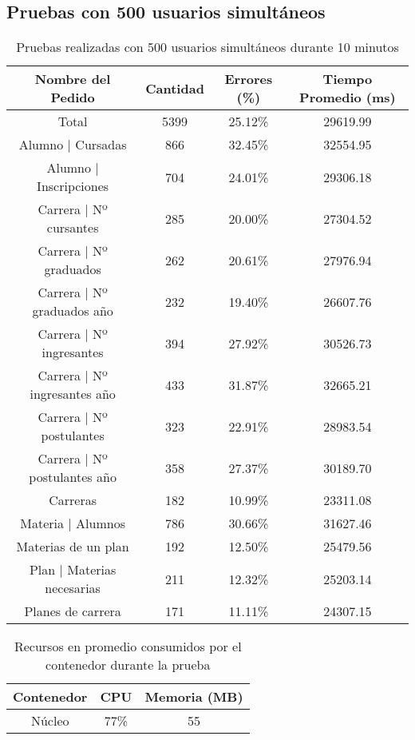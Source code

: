 \subsection{Pruebas con 500 usuarios simultáneos}
\begin{table}[]
    \centering
    \makegapedcells
    \begin{tabular}{|c|c|c|c|}
    \hline
    Nombre del Pedido & Cantidad & Errores (\%) & Tiempo Promedio (ms) \\ \hline
    Total & 5399 & 25.12\% & 29619.99 \\ \hline
    Alumno | Cursadas & 866 & 32.45\% & 32554.95 \\ \hline
    Alumno | Inscripciones & 704 & 24.01\% & 29306.18\\ \hline
    Carrera | Nº cursantes & 285 & 20.00\% & 27304.52\\ \hline
    Carrera | Nº graduados & 262 & 20.61\%	& 27976.94\\ \hline
    Carrera | Nº graduados año & 232 & 19.40\% & 26607.76\\ \hline
    Carrera | Nº ingresantes & 394 & 27.92\% & 30526.73\\ \hline
    Carrera | Nº ingresantes año & 433 & 31.87\% & 32665.21\\ \hline
    Carrera | Nº postulantes & 323 & 22.91\% & 28983.54\\ \hline
    Carrera | Nº postulantes año & 358 & 27.37\% & 30189.70\\ \hline
    Carreras & 182 & 10.99\% & 23311.08\\ \hline
    Materia | Alumnos & 786 & 30.66\% & 31627.46\\ \hline
    Materias de un plan & 192 & 12.50\%	& 25479.56\\ \hline
    Plan | Materias necesarias & 211 & 12.32\% & 25203.14\\ \hline
    Planes de carrera & 171 & 11.11\% & 24307.15\\ \hline

    \end{tabular}
    \caption{Pruebas realizadas con 500 usuarios simultáneos durante 10 minutos}
    \label{tab:tabla_planes}
\end{table}



\begin{table}[]
    \centering
    \makegapedcells
    \begin{tabular}{|c|c|c}
    \hline
    Contenedor & CPU & Memoria (MB)\\ \hline
    Núcleo & 77\% & 55 \\ \hline
    \end{tabular}
    \caption{Recursos en promedio consumidos por el contenedor durante la prueba}
    \label{tab:tabla_planes}
\end{table}

